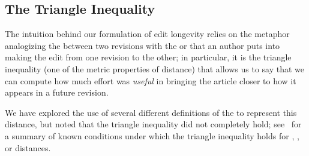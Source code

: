 \subsection{The Triangle Inequality}

The intuition behind our formulation of edit longevity relies on
the metaphor analogizing the  between two revisions
with the  or  that an author puts
into making the edit from one revision to the other;
in particular, it is the triangle inequality (one of the
metric properties of distance) that allows us to say that we
can compute how much effort was \textit{useful} in bringing
the article closer to how it appears in a future revision.

We have explored the use of several different definitions of
the  to represent this distance, but
noted that the triangle inequality did not completely hold;
see~\cite{Sankoff1999} for a summary of known conditions under which
the triangle inequality holds for
, , or  distances.

